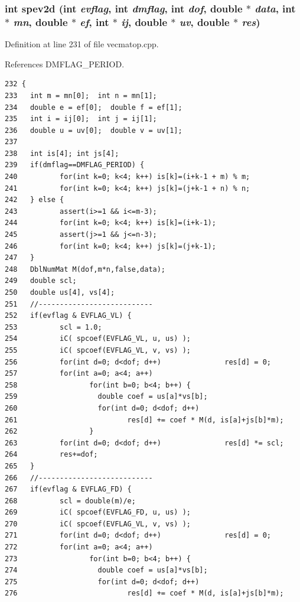 \subsubsection{\setlength{\rightskip}{0pt plus 5cm}int spev2d (int {\em evflag}, int {\em dmflag}, int {\em dof}, double $\ast$ {\em data}, int $\ast$ {\em mn}, double $\ast$ {\em ef}, int $\ast$ {\em ij}, double $\ast$ {\em uv}, double $\ast$ {\em res})}\label{vecmatop_8cpp_61d0ac8a5aa207a41929ece08f1f1422_61d0ac8a5aa207a41929ece08f1f1422}




Definition at line 231 of file vecmatop.cpp.

References DMFLAG\_\-PERIOD.

\footnotesize\begin{verbatim}232 {
233   int m = mn[0];  int n = mn[1];
234   double e = ef[0];  double f = ef[1];
235   int i = ij[0];  int j = ij[1];
236   double u = uv[0];  double v = uv[1];
237   
238   int is[4]; int js[4];
239   if(dmflag==DMFLAG_PERIOD) {
240          for(int k=0; k<4; k++) is[k]=(i+k-1 + m) % m;
241          for(int k=0; k<4; k++) js[k]=(j+k-1 + n) % n;
242   } else {
243          assert(i>=1 && i<=m-3);
244          for(int k=0; k<4; k++) is[k]=(i+k-1);
245          assert(j>=1 && j<=n-3);
246          for(int k=0; k<4; k++) js[k]=(j+k-1);
247   }
248   DblNumMat M(dof,m*n,false,data);
249   double scl;
250   double us[4], vs[4];
251   //---------------------------
252   if(evflag & EVFLAG_VL) {
253          scl = 1.0;
254          iC( spcoef(EVFLAG_VL, u, us) );
255          iC( spcoef(EVFLAG_VL, v, vs) );
256          for(int d=0; d<dof; d++)               res[d] = 0;
257          for(int a=0; a<4; a++)
258                 for(int b=0; b<4; b++) {
259                   double coef = us[a]*vs[b]; 
260                   for(int d=0; d<dof; d++)
261                          res[d] += coef * M(d, is[a]+js[b]*m);
262                 }
263          for(int d=0; d<dof; d++)               res[d] *= scl;
264          res+=dof;
265   }
266   //---------------------------
267   if(evflag & EVFLAG_FD) {
268          scl = double(m)/e;
269          iC( spcoef(EVFLAG_FD, u, us) );
270          iC( spcoef(EVFLAG_VL, v, vs) );
271          for(int d=0; d<dof; d++)               res[d] = 0;
272          for(int a=0; a<4; a++)
273                 for(int b=0; b<4; b++) {
274                   double coef = us[a]*vs[b];
275                   for(int d=0; d<dof; d++)
276                          res[d] += coef * M(d, is[a]+js[b]*m);

\end{verbatim}

